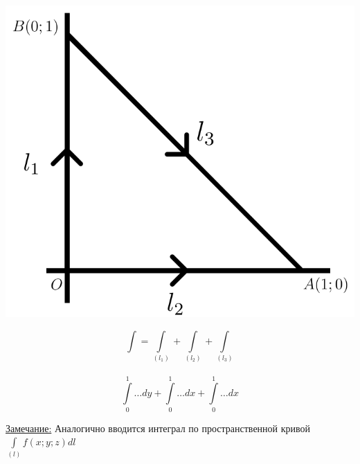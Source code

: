 \documentclass[12pt]{article}
\let\ORIincludegraphics\includegraphics
\renewcommand{\includegraphics}[2][]{\ORIincludegraphics[scale=0.65,#1]{#2}}
\let\oldint\int
\renewcommand{\int}{\oldint\limits}
\begin{document}
  \begin{minipage}{0.45\textwidth}
    \includegraphics[scale=0.6]{8.1.3.png}
  \end{minipage}
  \hspace{1em}
  \begin{minipage}{0.65\textwidth}
      \[\int = \int_{(l_1)}+\int_{(l_2)}+\int_{(l_3)}\]\\
      \[\int_{0}^{1}\dots dy+\int_{0}^{1}\dots dx+\int_{0}^{1}\dots dx\]
  \end{minipage}
  \vspace{1em}
  \par
  \underline{Замечание:} Аналогично вводится интеграл по пространственной кривой $\int_{(l)} f(x;y;z)dl$
\end{document}
